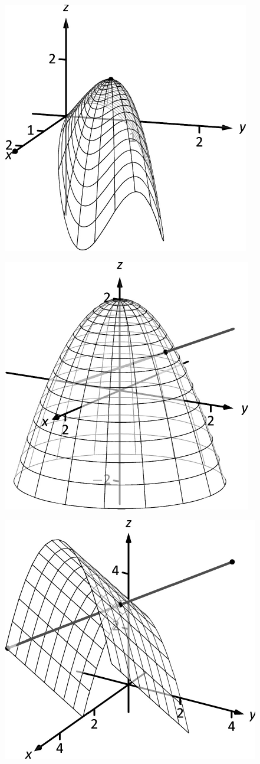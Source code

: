 \documentclass[10pt]{article}
\begin{document}
\includegraphics{figtpl2_3DBW.pdf}
\texttt{}

\includegraphics{figtpl3_3DBW.pdf}
\texttt{}

\includegraphics{figtpl5_3DBW.pdf}
\texttt{}
\end{document}
